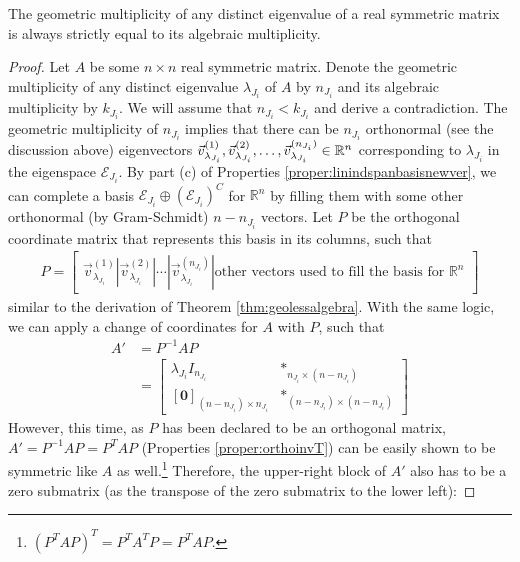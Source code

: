 \begin{proper}
\label{proper:symnodefic}
The geometric multiplicity of any distinct eigenvalue of a real symmetric matrix is always strictly equal to its algebraic multiplicity.
\end{proper}
\begin{proof}
Let $A$ be some $n \times n$ real symmetric matrix. Denote the geometric multiplicity of any distinct eigenvalue $\lambda_{J_i}$ of $A$ by $n_{J_i}$ and its algebraic multiplicity by $k_{J_i}$. We will assume that $n_{J_i} < k_{J_i}$ and derive a contradiction. The geometric multiplicity of $n_{J_i}$ implies that there can be $n_{J_i}$ orthonormal (see the discussion above) eigenvectors $\smash{\vec{v}^{(1)}_{\lambda_{J_i}}}, \smash{\vec{v}^{(2)}_{\lambda_{J_i}}}, \ldots, \smash{\vec{v}^{(n_{J_i})}_{\lambda_{J_i}}} \in \mathbb{R}^n$ corresponding to $\lambda_{J_i}$ in the eigenspace $\mathcal{E}_{J_i}$. By part (c) of Properties \ref{proper:linindspanbasisnewver}, we can complete a basis $\mathcal{E}_{J_i} \oplus (\mathcal{E}_{J_i})^C$ for $\mathbb{R}^n$ by filling them with some other orthonormal (by Gram-Schmidt) $n-n_{J_i}$ vectors. Let $P$ be the orthogonal coordinate matrix that represents this basis in its columns, such that
\begin{align*}
P = \begin{bmatrix}
\vec{v}^{(1)}_{\lambda_{J_i}} | \vec{v}^{(2)}_{\lambda_{J_i}} | \cdots | \vec{v}^{(n_{J_i})}_{\lambda_{J_i}} | \text{other vectors used to fill the basis for $\mathbb{R}^n$}
\end{bmatrix}
\end{align*}
similar to the derivation of Theorem \ref{thm:geolessalgebra}. With the same logic, we can apply a change of coordinates for $A$ with $P$, such that
\begin{align*}
A' &= P^{-1}AP \\
&= \begin{bmatrix}
\lambda_{J_i} I_{n_{J_i}} & *_{n_{J_i}\times(n-n_{J_i})} \\
[\textbf{0}]_{(n-n_{J_i})\times n_{J_i}} & *_{(n-n_{J_i})\times(n-n_{J_i})}
\end{bmatrix}
\end{align*}
However, this time, as $P$ has been declared to be an orthogonal matrix, $A' = P^{-1}AP = P^TAP$ (Properties \ref{proper:orthoinvT}) can be easily shown to be symmetric like $A$ as well.\footnote{$(P^TAP)^T = P^TA^TP = P^TAP$.} Therefore, the upper-right block of $A'$ also has to be a zero submatrix (as the transpose of the zero submatrix to the lower left):

\end{proof}
